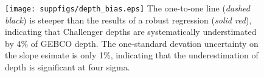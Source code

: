 \documentclass[12pt]{article}
\begin{document}
\begin{figure}%
\begin{center}
\texttt{[image: suppfigs/depth\_bias.eps]}
  The one-to-one line ({\it dashed black}) is steeper than the
results of a robust regression ({\it solid red}), indicating that Challenger
depths are systematically understimated by 4\% of GEBCO depth.  The
one-standard devation uncertainty on the slope esimate is only 1\%,
indicating that the underestimation of depth is significant at four
sigma.
\end{center} 
\end{figure}


\end{document}
